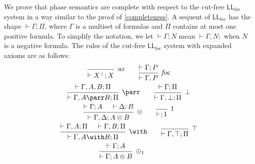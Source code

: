 \documentclass[11pt]{article}
\newcommand\LL{\textsf{LL}}
\newcommand\0{\textbf{0}}
\newcommand\1{\textbf{1}}
\newcommand\LLfoc{{\LL_\text{foc}}}
\begin{document}
We prove that phase semantics are complete with respect to the cut-free $\LLfoc$ system in a way similar to the proof of
\cref{completeness}. A sequent of $\LLfoc$ has the shape $\vdash \Gamma;\Pi$, where $\Gamma$ is a multiset of formulas and $\Pi$ contains at most
one positive formula. To simplify the notation, we let $\vdash \Gamma; N$ mean $\vdash \Gamma, N;$ when $N$ is a negative formula.
The rules of the cut-free $\LLfoc$ system with expanded axioms are as follows:
\begin{gather*}
    \begin{prooftree}
        \infer0[\textit{ax}]{\vdash X^\perp;X}
    \end{prooftree}
    \qquad
    \begin{prooftree}
        \hypo{\vdash\Gamma;P}
        \infer1[\textit{foc}]{\vdash \Gamma, P}
    \end{prooftree}
    \\
    \begin{prooftree}
        \hypo{\vdash \Gamma, A, B; \Pi}
        \infer1[$\parr$]{\vdash \Gamma, A \parr B; \Pi}
    \end{prooftree}
    \qquad
    \begin{prooftree}
        \hypo{\vdash \Gamma; \Pi}
        \infer1[$\bot$]{\vdash \Gamma, \bot; \Pi}
    \end{prooftree}
    \\
    \begin{prooftree}
        \hypo{\vdash \Gamma; A}
        \hypo{\vdash \Delta; B}
        \infer2[$\otimes$]{\vdash \Gamma, \Delta; A \otimes B}
    \end{prooftree}
    \qquad
    \begin{prooftree}
        \infer0[$1$]{\vdash ;1}
    \end{prooftree}
    \\
    \begin{prooftree}
        \hypo{\vdash \Gamma, A; \Pi}
        \hypo{\vdash \Gamma, B; \Pi}
        \infer2[$\with$]{\vdash \Gamma, A \with B; \Pi}
    \end{prooftree}
    \qquad
    \begin{prooftree}
        \infer0[$\top$]{\vdash \Gamma, \top; \Pi}
    \end{prooftree}
    \\
    \begin{prooftree}
        \hypo{\vdash \Gamma; A}
        \infer1[$\oplus_1$]{\vdash \Gamma; A \oplus B}
    \end{prooftree}
    \qquad

\end{gather*}
\end{document}
